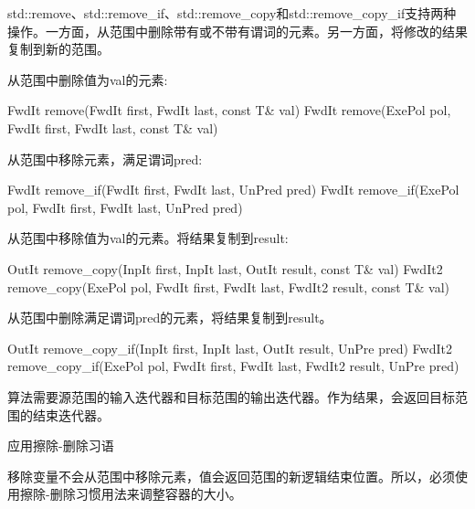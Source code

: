 
std::remove、std::remove\_if、std::remove\_copy和std::remove\_copy\_if支持两种操作。一方面，从范围中删除带有或不带有谓词的元素。另一方面，将修改的结果复制到新的范围。

从范围中删除值为val的元素:

\begin{cpp}
FwdIt remove(FwdIt first, FwdIt last, const T& val)
FwdIt remove(ExePol pol, FwdIt first, FwdIt last, const T& val)
\end{cpp}

从范围中移除元素，满足谓词pred:

\begin{cpp}
FwdIt remove_if(FwdIt first, FwdIt last, UnPred pred)
FwdIt remove_if(ExePol pol, FwdIt first, FwdIt last, UnPred pred)
\end{cpp}

从范围中移除值为val的元素。将结果复制到result:

\begin{cpp}
OutIt remove_copy(InpIt first, InpIt last, OutIt result, const T& val)
FwdIt2 remove_copy(ExePol pol, FwdIt first, FwdIt last,
					FwdIt2 result, const T& val)
\end{cpp}

从范围中删除满足谓词pred的元素，将结果复制到result。

\begin{cpp}
OutIt remove_copy_if(InpIt first, InpIt last, OutIt result, UnPre pred)
FwdIt2 remove_copy_if(ExePol pol, FwdIt first, FwdIt last,
						FwdIt2 result, UnPre pred)
\end{cpp}

算法需要源范围的输入迭代器和目标范围的输出迭代器。作为结果，会返回目标范围的结束迭代器。

\begin{myWarning}{应用擦除-删除习语}
	
移除变量不会从范围中移除元素，值会返回范围的新逻辑结束位置。所以，必须使用擦除-删除习惯用法来调整容器的大小。


\end{myWarning}

